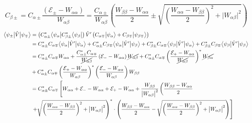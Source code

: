 \documentclass[12pt,fancychapters]{report}
\numberwithin{equation}{section}
\begin{document}
\begin{equation*}
  C_{\beta\pm}= C_{\alpha\pm}\frac{\left(\mathcal{E}_{\pm} - W_{\alpha\alpha}\right)}{W_{\alpha\beta}}
  =\frac{C_{\alpha\pm}}{W_{\alpha\beta}}\left(\frac{W_{\beta\beta}-W_{\alpha\alpha}}{2}\pm
  \sqrt{\left(\frac{W_{\alpha\alpha}-W_{\beta\beta}}{2}\right)^2 + \big|W_{\alpha\beta}\big|^2}\right)
\end{equation*}
\begin{align*}
  \big<\psi_\pm\big|\hat{V}\big|\psi_\mp\big>&= \left(C_{\alpha\pm}^*\big<\psi_\alpha\big|
  C_{\beta\pm}^*\big<\psi_\beta\big|\right)\hat{V}'\left(C_{\alpha\mp}\big|\psi_\alpha\big>
  + C_{\beta\mp}\big|\psi_{\beta\mp}\big>\right)\\
  &= C_{\alpha\pm}^*C_{\alpha\mp}\big<\psi_\alpha\big|\hat{V}'\big|\psi_{\alpha}\big> + 
  C_{\alpha\pm}^*C_{\beta\mp}\big<\psi_\alpha\big|\hat{V}'\big|\psi_{\beta}\big>+C_{\beta\pm}^*
  C_{\alpha\mp}\big<\psi_\beta\big|\hat{V}'\big|\psi_{\alpha}\big>+C_{\beta\pm}^*C_{\beta\mp}
  \big<\psi_\beta\big|\hat{V}'\big|\psi_{\beta}\big>\\
  &= C_{\alpha\pm}^*C_{\alpha\mp}W_{\alpha\alpha}+\frac{C_{\alpha\pm}^*C_{\alpha\mp}}
  {\cancel{W_{\alpha\beta}}}\left(\mathcal{E}_- - W_{\alpha\alpha}\right)\cancel{W_{\alpha\beta}}
  + C_{\alpha\pm}^*C_{\alpha\mp}\left(\frac{\mathcal{E}_+ - W_{\alpha\alpha}}{\cancel{
  W_{\alpha\beta}}}\right)^*\cancel{W_{\beta\alpha}} \\
  & + C_{\alpha\pm}^* C_{\alpha\mp}\left(\frac{\mathcal{E}_+ - W_{\alpha\alpha}}{W_{\alpha\beta}
  } \right)^*\left(\frac{\mathcal{E}_- - W_{\alpha\alpha}}{W_{\alpha\beta}}\right)W_{\beta\beta}\\
  &= C_{\alpha\pm}^*C_{\alpha\mp}\left[W_{\alpha\alpha}+\mathcal{E}_- -W_{\alpha\alpha} +
  \mathcal{E}_+ - W_{\alpha\alpha}+\frac{W_{\beta\beta}}{\big|W_{\alpha\beta}\big|^2} 
\left(\frac{W_{\beta\beta}- W_{\alpha\alpha}}{2}\right. \right.\\
  &\left.\left. +\sqrt{\left(\frac{W_{\alpha\alpha}-W_
{\beta\beta}}{2}\right)^2+\big|W_{\alpha\beta}\big|^2}\right)^*
\cdot\left(\frac{W_{\beta\beta}-W_{\alpha\alpha}}{2} - \sqrt{\left(\frac{W_{\alpha\alpha}-
W_{\beta\beta}}{2}\right)^2+\big|W_{\alpha\beta}\big|^2}\right)\right]
\end{align*}
\end{document}
